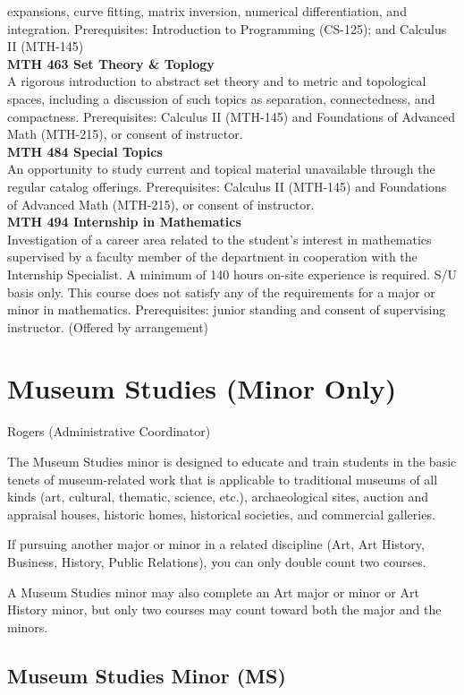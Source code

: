\documentclass[
  letterpaper,
]{scrbook}
\begin{document}
expansions, curve fitting, matrix inversion, numerical differentiation,
and integration. Prerequisites: Introduction to Programming (CS-125);
and Calculus II (MTH-145)\\
\textbf{MTH 463 Set Theory \& Toplogy}\\
A rigorous introduction to abstract set theory and to metric and
topological spaces, including a discussion of such topics as separation,
connectedness, and compactness. Prerequisites: Calculus II (MTH-145) and
Foundations of Advanced Math (MTH-215), or consent of instructor.\\
\textbf{MTH 484 Special Topics}\\
An opportunity to study current and topical material unavailable through
the regular catalog offerings. Prerequisites: Calculus II (MTH-145) and
Foundations of Advanced Math (MTH-215), or consent of instructor.\\
\textbf{MTH 494 Internship in Mathematics}\\
Investigation of a career area related to the student's interest in
mathematics supervised by a faculty member of the department in
cooperation with the Internship Specialist. A minimum of 140 hours
on-site experience is required. S/U basis only. This course does not
satisfy any of the requirements for a major or minor in mathematics.
Prerequisites: junior standing and consent of supervising instructor.
(Offered by arrangement)

\section{Museum Studies (Minor Only)}\label{museum-studies-minor-only}

Rogers (Administrative Coordinator)

The Museum Studies minor is designed to educate and train students in
the basic tenets of museum-related work that is applicable to
traditional museums of all kinds (art, cultural, thematic, science,
etc.), archaeological sites, auction and appraisal houses, historic
homes, historical societies, and commercial galleries.

If pursuing another major or minor in a related discipline (Art, Art
History, Business, History, Public Relations), you can only double count
two courses.

A Museum Studies minor may also complete an Art major or minor or Art
History minor, but only two courses may count toward both the major and
the minors.

\subsection{Museum Studies Minor (MS)}\label{museum-studies-minor-ms}
\end{document}
